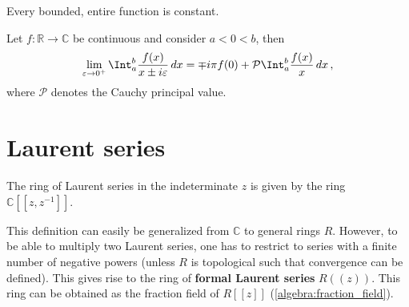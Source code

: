     \begin{theorem}[Liouville]
        Every bounded, entire function is constant.
    \end{theorem}

    \begin{theorem}\label{complex:sokhotski_plemelj}
        Let $f:\mathbb{R}\rightarrow\mathbb{C}$ be continuous and consider $a<0<b$, then
        \begin{gather}
            \lim_{\varepsilon\rightarrow0^+}\Int_a^b\frac{f(x)}{x\pm i\varepsilon}\,dx = \mp i\pi f(0) + \mathcal{P}\Int_a^b\frac{f(x)}{x}\,dx\,,
        \end{gather}
        where $\mathcal{P}$ denotes the Cauchy principal value.

    \end{theorem}

\section{Laurent series}

    \begin{notation}
        The ring of Laurent series in the indeterminate $z$ is given by the ring $\mathbb{C}[[z,z^{-1}]]$.
    \end{notation}

    \begin{remark}[Multiplication]
        This definition can easily be generalized from $\mathbb{C}$ to general rings $R$. However, to be able to multiply two Laurent series, one has to restrict to series with a finite number of negative powers (unless $R$ is topological such that convergence can be defined). This gives rise to the ring of \textbf{formal Laurent series} $R((z))$. This ring can be obtained as the fraction field of $R[[z]]$ (\cref{algebra:fraction_field}).
    \end{remark}

